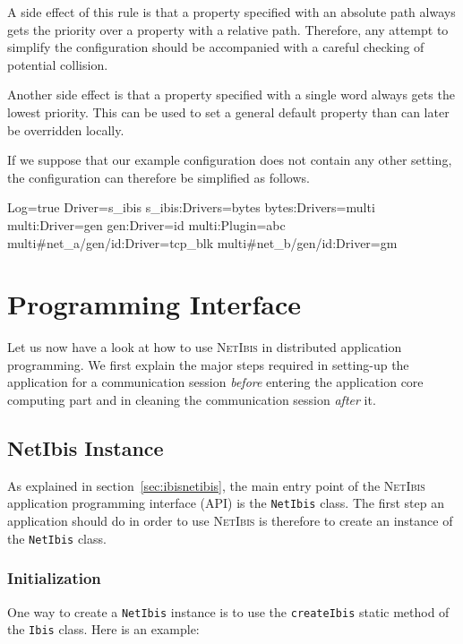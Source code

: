 \documentclass[11pt]{book}
\def\NetIbis{\textsc{NetIbis}\xspace}
\def\netibis{\texttt{NetIbis}\xspace}
\begin{document}
A side effect of this rule is that a property specified with an
absolute path always gets the priority over a property with a relative
path. Therefore, any attempt to simplify the configuration should be
accompanied with a careful checking of potential collision.

Another side effect is that a property specified with a single word
always gets the lowest priority. This can be used to set a general
default property than can later be overridden locally.

If we suppose that our example configuration does not contain any
other setting, the configuration can therefore be simplified as
follows.
\begin{Miniverb}

  Log=true
  Driver=s_ibis
  s_ibis:Drivers=bytes
  bytes:Drivers=multi
  multi:Driver=gen
  gen:Driver=id
  multi:Plugin=abc
  multi#net_a/gen/id:Driver=tcp_blk
  multi#net_b/gen/id:Driver=gm

\end{Miniverb}

\section{Programming Interface}
\label{sec:progr-interf}
Let us now have a look at how to use \NetIbis in distributed
application programming. We first explain the major steps required in
setting-up the application for a communication session \emph{before}
entering the application core computing part and in cleaning the
communication session \emph{after} it.

\subsection{NetIbis Instance}
\label{sec:netibis-instance}

As explained in section~\ref{sec:ibisnetibis}, the main entry point of
the \NetIbis application programming interface (API) is the \netibis
class. The first step an application should do in order to use
\NetIbis is therefore to create an instance of the \netibis class.

%
\subsubsection{Initialization}
\label{sec:initialization}

One way to create a \netibis instance is to use the
\texttt{createIbis} static method of the \texttt{Ibis} class. Here is
an example:
\end{document}
